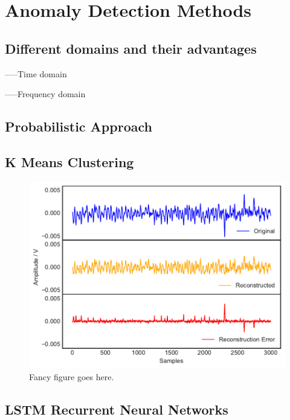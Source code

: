 \section{Anomaly Detection Methods}

\subsection{Different domains and their advantages}
-----Time domain

-----Frequency domain

\subsection{Probabilistic Approach}

\subsection{K Means Clustering}

\begin{figure}[t]
    \includegraphics[width=1.0\textwidth]{fig/kmeans.pdf}
    \caption[K mean clustering plot]{Fancy figure goes here.}
    \label{fig:kmeanerror}
\end{figure}

\subsection{LSTM Recurrent Neural Networks}

